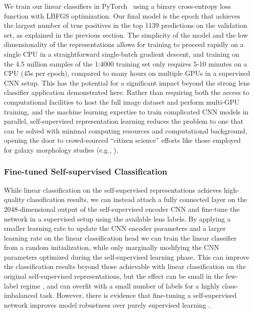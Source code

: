 \documentclass{aastex631}
\begin{document}
We train our linear classifiers in PyTorch~\citep{pytorch} using a binary cross-entropy loss function with LBFGS optimization. Our final model is the epoch that achieves the largest number of true positives in the top 1139 predictions on the validation set, as explained in the previous section. The simplicity of the model and the low dimensionality of the representations allows for training to proceed rapidly on a single CPU in a straightforward single-batch gradient descent, and training on the 4.5 million samples of the 1:4000 training set only requires 5-10 minutes on a CPU (45s per epoch), compared to many hours on multiple GPUs in a supervised CNN setup. This has the potential for a significant impact beyond the strong lens classifier application demonstrated here. Rather than requiring both the access to computational facilities to host the full image dataset and perform multi-GPU training, and the machine learning expertise to train complicated CNN models in parallel, self-supervised representation learning reduces the problem to one that can be solved with minimal computing resources and computational background, opening the door to crowd-sourced ``citizen science'' efforts like those employed for galaxy morphology studies (e.g.,  \cite{GZ1, GZ2}).

\subsubsection{Fine-tuned Self-supervised Classification}
\label{sec:finetuning_methods}

While linear classification on the self-supervised representations achieves high-quality classification results, we can instead attach a fully connected layer on the 2048-dimensional output of the self-supervised encoder CNN and fine-tune the network in a supervised setup using the available lens labels. By applying a smaller learning rate to update the CNN encoder parameters and a larger learning rate on the linear classification head we can train the linear classifier from a random initialization, while only marginally modifying the CNN parameters optimized during the self-supervised learning phase. This can improve the classification results beyond those achievable with linear classification on the original self-supervised representations, but the effect can be small in the few-label regime \citep{Hayat_2021}, and can overfit with a small number of labels for a highly class-imbalanced task. However, there is evidence that fine-tuning a self-supervised network improves model robustness over purely supervised learning \citep{ssl_robustness}.
\end{document}
